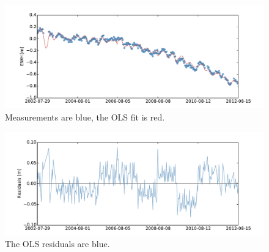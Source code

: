 \begin{figure}[H]
	\centering
	\includegraphics[width=\textwidth]{figures/splines-selected-1-fit}
	\caption{Measurements are blue, the OLS fit is red.}
	\label{fig:splines-selected-1-fit}
\end{figure}

\begin{figure}[H]
	\centering
	\includegraphics[width=\textwidth]{figures/splines-selected-1-residual}
	\caption{The OLS residuals are blue.}
	\label{fig:splines-selected-1-residual}
\end{figure}
